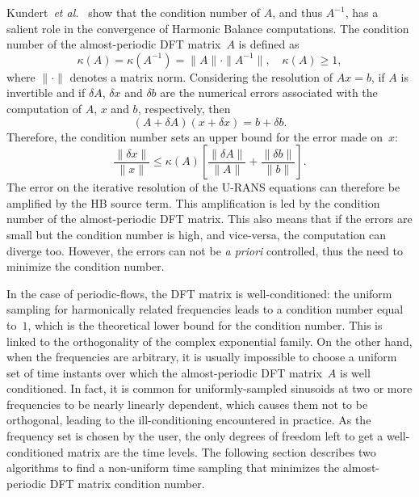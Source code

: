 Kundert~\emph{et al.}~\cite{Kundert1988} show that the condition
number of $A$, and thus $A^{-1}$, has a salient role in the
convergence of Harmonic Balance computations. The condition number of
the almost-periodic DFT matrix~$A$ is defined as
\begin{equation}
   \kappa (A) = \kappa (A^{-1}) = \| A \| \cdot \| A^{-1} \|, \quad
   \kappa(A) \geq 1,
   \label{eq:condition_number}
\end{equation}
where $\| \cdot \|$ denotes a matrix norm.  Considering the resolution
of $A x = b$, if $A$ is invertible and if $\delta A$, $\delta x$ and
$\delta b$ are the numerical errors associated with the computation of
$A$, $x$ and $b$, respectively, then
\begin{equation}
   (A + \delta A)(x + \delta x) = b + \delta b.
   \label{eq:error_reso}
\end{equation}
Therefore, the condition number sets an upper bound for the error made on~$x$:
\begin{equation}
   \frac{\| \delta x \|}{\| x \|} \leq \kappa(A)\left[\frac{\| \delta A \|}{\| A \|} + \frac{\| \delta b \|}{\| b \|} \right].
   \label{eq:conditonnig_amp}
\end{equation}
The error on the iterative resolution of the U-RANS equations can
therefore be amplified by the HB source term. This amplification is
led by the condition number of the almost-periodic DFT matrix. This
also means that if the errors are small but the condition number is
high, and vice-versa, the computation can diverge too. However, the
errors can not be \emph{a priori} controlled, thus the need to
minimize the condition number.

In the case of periodic-flows, the DFT matrix is well-conditioned: the
uniform sampling for harmonically related frequencies leads to a
condition number equal to~$1$, which is the theoretical lower bound
for the condition number.  This is linked to the orthogonality of the
complex exponential family.  On the other hand, when the frequencies are arbitrary, it is usually
impossible to choose a uniform set of time instants over which the
almost-periodic DFT matrix~$A$ is well conditioned. In fact, it is common for uniformly-sampled
sinusoids at two or more frequencies to be nearly linearly dependent,
which causes them not to be orthogonal, leading to the
ill-conditioning encountered in practice. As the frequency set is
chosen by the user, the only degrees of freedom left to get a
well-conditioned matrix are the time levels.  The following section
describes two algorithms to find a non-uniform time sampling that
minimizes the almost-periodic DFT matrix condition number.


